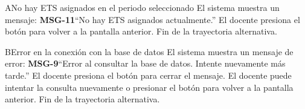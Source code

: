 \begin{UCtrayectoriaA}{A}{No hay ETS asignados en el periodo seleccionado}
	\UCpaso El sistema muestra un mensaje: {\bf MSG-11}{``No hay ETS asignados actualmente.''}
	\UCpaso[\UCactor] El docente presiona el botón  para volver a la pantalla anterior.
	\UCpaso Fin de la trayectoria alternativa.
\end{UCtrayectoriaA}
\begin{UCtrayectoriaA}{B}{Error en la conexión con la base de datos}
	\UCpaso El sistema muestra un mensaje de error: {\bf MSG-9}{``Error al consultar la base de datos. Intente nuevamente más tarde.''}
	\UCpaso[\UCactor] El docente presiona el botón  para cerrar el mensaje.
	\UCpaso[\UCactor] El docente puede intentar la consulta nuevamente o presionar el botón  para volver a la pantalla anterior.
	\UCpaso Fin de la trayectoria alternativa.
\end{UCtrayectoriaA}

